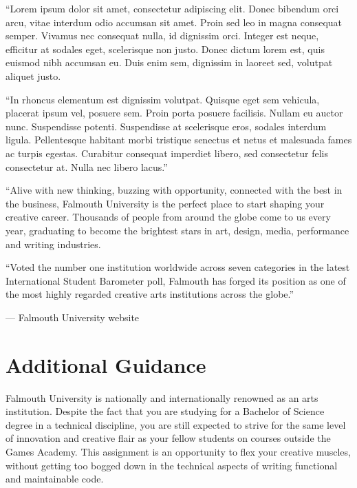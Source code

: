 \documentclass{../fal_assignment}
\begin{document}
\begin{marginquote}
    ``Lorem ipsum dolor sit amet, consectetur adipiscing elit. Donec bibendum orci arcu, vitae interdum odio accumsan sit amet. Proin sed leo in magna consequat semper. Vivamus nec consequat nulla, id dignissim orci. Integer est neque, efficitur at sodales eget, scelerisque non justo. Donec dictum lorem est, quis euismod nibh accumsan eu. Duis enim sem, dignissim in laoreet sed, volutpat aliquet justo.
    
    ``In rhoncus elementum est dignissim volutpat. Quisque eget sem vehicula, placerat ipsum vel, posuere sem. Proin porta posuere facilisis. Nullam eu auctor nunc. Suspendisse potenti. Suspendisse at scelerisque eros, sodales interdum ligula. Pellentesque habitant morbi tristique senectus et netus et malesuada fames ac turpis egestas. Curabitur consequat imperdiet libero, sed consectetur felis consectetur at. Nulla nec libero lacus.''
\end{marginquote}
\clearpage
\begin{marginquote}
    ``Alive with new thinking, buzzing with opportunity, connected with the best in the business,
    Falmouth University is the perfect place to start shaping your creative career.
    Thousands of people from around the globe come to us every year,
    graduating to become the brightest stars in art, design, media, performance and writing industries.

    ``Voted the number one institution worldwide across seven categories in the latest International Student Barometer poll,
    Falmouth has forged its position as one of the most highly regarded creative arts institutions across the globe.''
    
    --- Falmouth University website
\end{marginquote}
\section*{Additional Guidance}

Falmouth University is nationally and internationally renowned as an arts institution.
Despite the fact that you are studying for a Bachelor of Science degree in a technical discipline,
you are still expected to strive for the same level of innovation and creative flair
as your fellow students on courses outside the Games Academy.
This assignment is an opportunity to flex your creative muscles, without getting too bogged down
in the technical aspects of writing functional and maintainable code.
\end{document}

